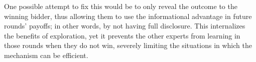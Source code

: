 One possible attempt to fix this would be to only reveal the outcome to the winning bidder, thus allowing them to use the informational advantage in future rounds' payoffs; in other words, by not having full disclosure.
This internalizes the benefits of exploration, yet it prevents the other experts from learning in those rounds when they do not win, severely limiting the situations in which the mechanism can be efficient.










